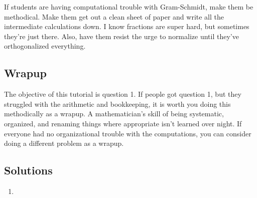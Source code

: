 \documentclass[11pt]{exam}
\begin{document}
	If students are having computational trouble with Gram-Schmidt, make them 
	be methodical.  Make them get out a clean sheet of paper and write all the
	intermediate calculations down.  I know fractions are super hard, but 
	sometimes they're just there.  Also, have them resist the urge to normalize until
	they've orthogonalized everything.

\subsection*{Wrapup}
	The objective of this tutorial is question 1.  If people got question 1, but they
	struggled with the arithmetic and bookkeeping, it is worth you doing this methodically
	as a wrapup.  A mathematician's skill of being systematic, organized, and renaming
	things where appropriate isn't learned over night.  If everyone had no organizational
	trouble with the computations, you can consider doing a different problem as a wrapup.


\subsection*{Solutions}
\begin{enumerate}
	\item
\end{enumerate}
	
\end{document}

